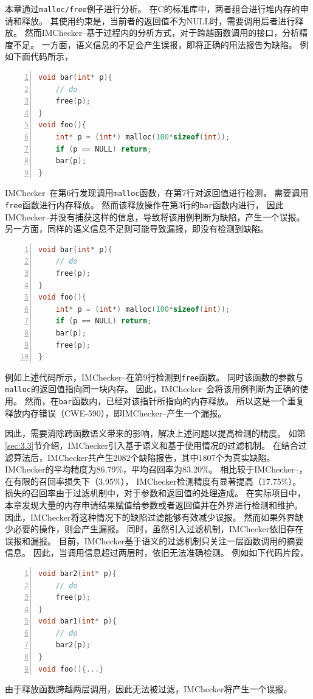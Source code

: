 本章通过\texttt{malloc/free}例子进行分析。
在C的标准库中，两者组合进行堆内存的申请和释放。
其使用约束是，当前者的返回值不为NULL时，需要调用后者进行释放。
然而IMChecker--基于过程内的分析方式，对于跨越函数调用的接口，分析精度不足。
一方面，语义信息的不足会产生误报，即将正确的用法报告为缺陷。
例如下面代码所示，
\begin{lstlisting}[language={C},
basicstyle=\linespread{0.7}\listingsfont,
numbers=left,
xleftmargin=.3\textwidth]
void bar(int* p){
	// do
	free(p);
}
void foo(){
	int* p = (int*) malloc(100*sizeof(int));
	if (p == NULL) return;
	bar(p);
}
\end{lstlisting}
IMChecker--在第6行发现调用\texttt{malloc}函数，在第7行对返回值进行检测，
需要调用\texttt{free}函数进行内存释放。
然而该释放操作在第3行的\texttt{bar}函数内进行，
因此IMChecker--并没有捕获这样的信息，导致将该用例判断为缺陷，产生一个误报。
另一方面，同样的语义信息不足则可能导致漏报，即没有检测到缺陷。
\begin{lstlisting}[language={C},
basicstyle=\linespread{0.7}\listingsfont,
numbers=left,
xleftmargin=.3\textwidth]
void bar(int* p){
	// do
	free(p);
}
void foo(){
	int* p = (int*) malloc(100*sizeof(int));
	if (p == NULL) return;
	bar(p);
	free(p);
}
\end{lstlisting}
例如上述代码所示，IMChecker--在第9行检测到\texttt{free}函数。
同时该函数的参数与\texttt{malloc}的返回值指向同一块内存。
因此，IMChecker--会将该用例判断为正确的使用。
然而，在\texttt{bar}函数内，已经对该指针所指向的内存释放。
所以这是一个重复释放内存错误（CWE-590），即IMChecker--产生一个漏报。

因此，需要消除跨函数语义带来的影响，解决上述问题以提高检测的精度。
如第\ref{sec:3.3}节介绍，IMChecker引入基于语义和基于使用情况的过滤机制。
在结合过滤算法后，IMChecker共产生2082个缺陷报告，其中1807个为真实缺陷。
IMChecker的平均精度为86.79\%，平均召回率为83.20\%。
相比较于IMChecker--，在有限的召回率损失下（3.95\%），
IMChecker检测精度有显著提高（17.75\%）。
损失的召回率由于过滤机制中，对于参数和返回值的处理造成。
在实际项目中，本章发现大量的内存申请结果赋值给参数或者返回值并在外界进行检测和维护。
因此，IMChecker将这种情况下的缺陷过滤能够有效减少误报。
然而如果外界缺少必要的操作，则会产生漏报。
同时，虽然引入过滤机制，IMChecker依旧存在误报和漏报。
目前，IMChecker基于语义的过滤机制只关注一层函数调用的摘要信息。
因此，当调用信息超过两层时，依旧无法准确检测。
例如如下代码片段，
\begin{lstlisting}[language={C},
basicstyle=\linespread{0.7}\listingsfont,
numbers=left,
xleftmargin=.35\textwidth]
void bar2(int* p){        
	// do						   
	free(p);					  
}
void bar1(int* p){        
	// do						   
	bar2(p);					  
}
void foo(){...}
\end{lstlisting}
由于释放函数跨越两层调用，因此无法被过滤，IMChecker将产生一个误报。


